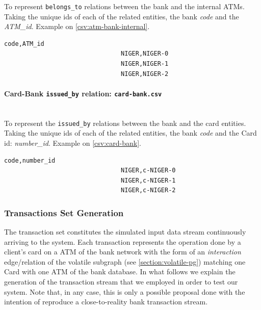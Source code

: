 To represent \texttt{belongs\_to} relations between the bank and the internal ATMs. Taking the unique ids of each of the related entities, the bank \emph{code} and the \emph{ATM\_id}. Example on \ref{csv:atm-bank-internal}.

\begin{center}
\lstset{style=csvStyle}
\begin{lstlisting}[caption={Example of a atm-bank-internal.csv}, label={csv:atm-bank-internal}]
                                code,ATM_id
                                NIGER,NIGER-0
                                NIGER,NIGER-1
                                NIGER,NIGER-2
\end{lstlisting}
\end{center}

\paragraph{Card-Bank \texttt{issued\_by} relation: \texttt{card-bank.csv}\\\\}

To represent the \texttt{issued\_by} relations between the bank and the card entities. Taking the unique ids of each of the related entities, the bank \emph{code} and the Card id: \emph{number\_id}. Example on \ref{csv:card-bank}.

\begin{center}
\lstset{style=csvStyle}
\begin{lstlisting}[caption={Example of a card-bank.csv}, label={csv:card-bank}]
                                code,number_id
                                NIGER,c-NIGER-0
                                NIGER,c-NIGER-1
                                NIGER,c-NIGER-2
\end{lstlisting}
\end{center}

\subsubsection*{Transactions Set Generation}


The transaction set constitutes the simulated input data stream continuously arriving to the system. Each transaction represents the operation done by a client's card on a ATM of the bank network with the form of an \emph{interaction} edge/relation of the volatile subgraph (see \ref{section:volatile-pg}) matching one Card with one ATM of the bank database. In what follows we explain the generation of the transaction stream that we employed in order to test our system. Note that, in any case, this is only a possible proposal done with the intention of reproduce a close-to-reality bank transaction stream.

